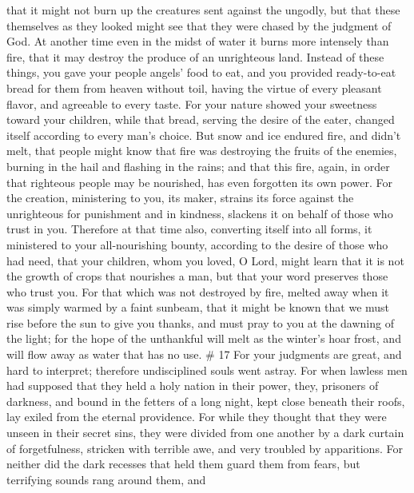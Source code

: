 that it might not burn up the creatures sent against the ungodly, but
that these themselves as they looked might see that they were chased by
the judgment of God.  At another time even in the midst
of water it burns more intensely than fire, that it may destroy the
produce of an unrighteous land.  Instead of these things,
you gave your people angels' food to eat, and you provided ready-to-eat
bread for them from heaven without toil, having the virtue of every
pleasant flavor, and agreeable to every taste.  For your
nature showed your sweetness toward your children, while that bread,
serving the desire of the eater, changed itself according to every man's
choice.  But snow and ice endured fire, and didn't melt,
that people might know that fire was destroying the fruits of the
enemies, burning in the hail and flashing in the rains; 
and that this fire, again, in order that righteous people may be
nourished, has even forgotten its own power.  For the
creation, ministering to you, its maker, strains its force against the
unrighteous for punishment and in kindness, slackens it on behalf of
those who trust in you.  Therefore at that time also,
converting itself into all forms, it ministered to your all-nourishing
bounty, according to the desire of those who had need, 
that your children, whom you loved, O Lord, might learn that it is not
the growth of crops that nourishes a man, but that your word preserves
those who trust you.  For that which was not destroyed by
fire, melted away when it was simply warmed by a faint sunbeam,
 that it might be known that we must rise before the sun
to give you thanks, and must pray to you at the dawning of the light;
 for the hope of the unthankful will melt as the winter's
hoar frost, and will flow away as water that has no use. \# 17
 For your judgments are great, and hard to interpret;
therefore undisciplined souls went astray.  For when
lawless men had supposed that they held a holy nation in their power,
they, prisoners of darkness, and bound in the fetters of a long night,
kept close beneath their roofs, lay exiled from the eternal providence.
 For while they thought that they were unseen in their
secret sins, they were divided from one another by a dark curtain of
forgetfulness, stricken with terrible awe, and very troubled by
apparitions.  For neither did the dark recesses that held
them guard them from fears, but terrifying sounds rang around them, and
